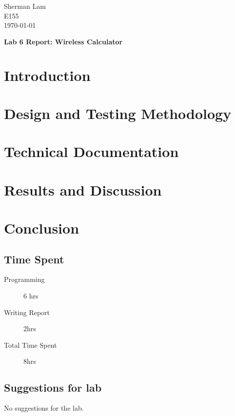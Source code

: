 \documentclass[11pt]{article}
\begin{document}
\begin{flushleft}
Sherman Lam
\\E155
\\ \today
\end{flushleft}


\begin{center}
\begin{Large}
\textbf{Lab 6 Report: Wireless Calculator}
\end{Large}
\end{center}




\section{Introduction}




\section{Design and Testing Methodology}

\section{Technical Documentation}


\section{Results and Discussion}


\section{Conclusion}

\subsection{Time Spent}

\begin{description}
	\item[Programming] 6 hrs
 	\item[Writing Report] 2hrs
	\item[Total Time Spent] 8hrs
\end{description}

\subsection{Suggestions for lab}

No suggestions for the lab.
\end{document}
